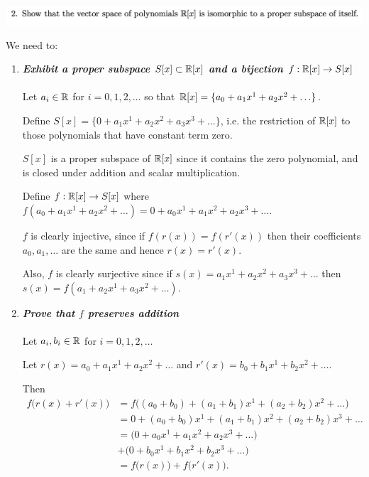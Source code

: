 \documentclass[12pt]{article}
\begin{document}
\subsection*{} %
\includegraphics[width=450pt]{img/linear-algebra-a0-1-2.png}\\
\begin{mdframed}
We need to:
\begin{enumerate}
\item \textbf{\textit{Exhibit a proper subspace $S[x] \subset \mathbb{R}[x]$ and a bijection $f:\mathbb{R}[x] \to S[x]$}}\\\\
  Let $a_i \in \mathbb{R}$ for $i = 0, 1, 2, \ldots$ so that
  $\mathbb{R}[x] = \{a_0 + a_1x^1 + a_2x^2 + \ldots\}$.

  Define $S[x] = \{0 + a_1x^1 + a_2x^2 + a_3x^3 + \ldots\}$, i.e. the restriction
  of $\mathbb{R}[x]$ to those polynomials that have constant term zero.

  $S[x]$ is a proper subspace of $\mathbb{R}[x]$ since it contains the zero polynomial,
  and is closed under addition and scalar multiplication.

  Define $f: \mathbb{R}[x] \to S[x]$ where
  $f(a_0 + a_1x^1 + a_2x^2 + \ldots) = 0 + a_0x^1 + a_1x^2 + a_2x^3 + \ldots$.

  $f$ is clearly injective, since if $f(r(x)) = f(r'(x))$ then their
  coefficients $a_0, a_1, \ldots$ are the same and hence $r(x) = r'(x)$.

  Also, $f$ is clearly surjective since if
  $s(x) = a_1x^1 + a_2x^2 + a_3x^3 + \ldots$ then
  $s(x) = f(a_1 + a_2x^1 + a_3x^2 + \ldots)$.

\item \textbf{\textit{Prove that $f$ preserves addition}}\\\\
  Let $a_i,b_i \in \mathbb{R}$ for $i = 0, 1, 2, \ldots$

  Let $r(x) = a_0 + a_1x^1 + a_2x^2 + \ldots$ and $r'(x) = b_0 + b_1x^1 + b_2x^2 + \ldots$.

  Then
  \begin{align*}
    f\Big(r(x) + r'(x)\Big)
    &= f\Big((a_0 + b_0) + (a_1 + b_1)x^1 + (a_2 + b_2)x^2 + \ldots\Big)\\
    &= 0 + (a_0 + b_0)x^1 + (a_1 + b_1)x^2 + (a_2 + b_2)x^3 + \ldots\\
    &= \Big(0 + a_0x^1 + a_1x^2 + a_2x^3 + \ldots \Big) \\
    &+ \Big(0 + b_0x^1 + b_1x^2 + b_2x^3 + \ldots \Big) \\
    &= f\Big(r(x)\Big) + f\Big(r'(x)\Big).
  \end{align*}


\end{enumerate}
\end{mdframed}
\end{document}
